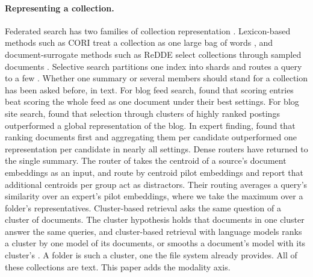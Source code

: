 \documentclass[11pt]{article}
\begin{document}
\paragraph{Representing a collection.} Federated search has two families of collection representation \citep{shokouhi2011federated}. Lexicon-based methods such as CORI treat a collection as one large bag of words \citep{callan1995cori}, and document-surrogate methods such as ReDDE select collections through sampled documents \citep{si2003redde}. Selective search partitions one index into shards and routes a query to a few \citep{kulkarni2010allocation,kulkarni2012ranks,aly2013taily}. Whether one summary or several members should stand for a collection has been asked before, in text. For blog feed search, \citet{elsas2008blogfeed} found that scoring entries beat scoring the whole feed as one document under their best settings. For blog site search, \citet{seo2008blogsite} found that selection through clusters of highly ranked postings outperformed a global representation of the blog. In expert finding, \citet{balog2006expert} found that ranking documents first and aggregating them per candidate outperformed one representation per candidate in nearly all settings. Dense routers have returned to the single summary. The router of \citet{dhasade2026ragroute} takes the centroid of a source's document embeddings as an input, and \citet{lee2025routerretriever} route by centroid pilot embeddings and report that additional centroids per group act as distractors. Their routing averages a query's similarity over an expert's pilot embeddings, where we take the maximum over a folder's representatives. Cluster-based retrieval asks the same question of a cluster of documents. The cluster hypothesis \citep{voorhees1985cluster} holds that documents in one cluster answer the same queries, and cluster-based retrieval with language models ranks a cluster by one model of its documents, or smooths a document's model with its cluster's \citep{liu2004cluster,kurland2004corpus}. A folder is such a cluster, one the file system already provides. All of these collections are text. This paper adds the modality axis.
\end{document}

